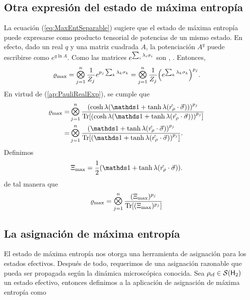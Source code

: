 \subsection{Otra expresión del estado de máxima entropía}


La ecuación (\ref{eq:MaxEntSeparable}) sugiere que el estado de máxima entropía puede expresarse como producto tensorial de potencias de un mismo estado. En efecto, dado un real $q$ y una matriz cuadrada $A$, la potenciación $A^{q}$ puede escribirse como $e^{q \ln A}$. Como las matrices $e^{\sum_{i}\lambda_{i}\sigma_{i}}$ son ,  . Entonces,
\begin{equation}
    \varrho_{\max}=\Motimes_{j=1}^{n}\frac{1}{Z_{j}}e^{p_{j}\sum_{k}\lambda_{k}\pauli{k}}=\Motimes_{j=1}^{n}\frac{1}{Z_{j}}\qty(e^{\sum_{k}\lambda_{k}\pauli{k}})^{p_{j}}.\nonumber
\end{equation}
En virtud de (\ref*{ap:PauliRealExp}), se cumple que
\begin{align}
  \varrho_{\max}=&\Motimes_{j=1}^{n}\frac{\qty(\cosh{\lambda}(\Id+\tanh{\lambda}(\paulivec{r_{\rho}})))^{p_{j}}}{\Tr[\qty(\cosh{\lambda}(\Id+\tanh{\lambda}(\paulivec{r_{\rho}})))^{p_{j}}]}\nonumber\\
  =&\Motimes_{j=1}^{n}\frac{\qty(\Id+\tanh{\lambda}(\paulivec{r_{\rho}}))^{p_{j}}}{\Tr[\qty(\Id+\tanh{\lambda}(\paulivec{r_{\rho}}))^{p_{j}}]}.\nonumber
\end{align}
Definimos
\begin{equation}\label{eq:Xi}
  \Xi_{\max}=\frac{1}{2}(\Id+\tanh{\lambda}(\paulivec{r_{\rho}})).
\end{equation}
de tal manera que 
\begin{equation}\label{eq:MaxEntSeparablePower}
  \varrho_{\max}=\Motimes_{j=1}^{n}\frac{(\Xi_{\max})^{p_{j}}}{\Tr[ (\Xi_{\max})^{p_{j}}]}
\end{equation}

\subsection{La asignación de máxima entropía}

El estado de máxima entropía nos otorga una herramienta de asignación para los estados efectivos. Después de todo, requerimos de una asignación razonable que pueda ser propagada según la dinámica microscópica conocida. Sea $\rho_{\text{ef}}\in\mathcal{S}({\sf H}_{2})$ un estado efectivo, entonces definimos a la aplicación de asignación de máxima entropía como

